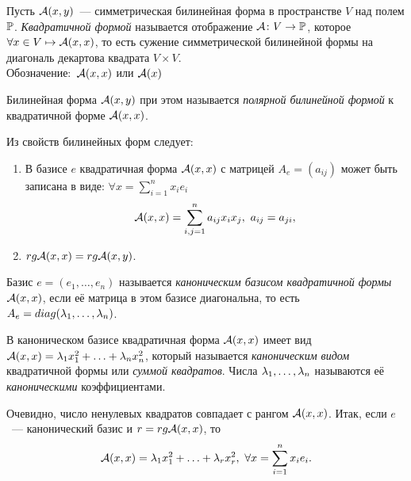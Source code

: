\begin{definition}
Пусть ${\mathcal{A}}(x,y)$~--- симметрическая билинейная форма в пространстве $V$ над полем ${\mathbb{P}}$. \emph{Квадратичной формой} называется отображение ${\mathcal{A}}\colon V\to{\mathbb{P}}$, которое $\forall x\in V\mapsto {\mathcal{A}}(x,x)$, то есть сужение симметрической билинейной формы на диагональ декартова квадрата $V\times V$.\\
\textsf{Обозначение:}~${\mathcal{A}}(x,x)$ или ${\mathcal{A}}(x)$
\end{definition}

\begin{definition}
Билинейная форма ${\mathcal{A}}(x,y)$ при этом называется \emph{полярной билинейной формой} к квадратичной форме ${\mathcal{A}}(x,x)$.
\end{definition}

\begin{Commentwhite}
Из свойств билинейных форм следует:
\begin{enumerate}
    \item В базисе $e$ квадратичная форма ${\mathcal{A}}(x,x)$ с матрицей $A_e=(a_{ij})$ может быть записана в виде: $\forall x=\sum_{i=1}^nx_ie_i$
    \begin{equation}
    \label{eq общий вид кв. формы}
        {\mathcal{A}}(x,x)=\sum_{i,j=1}^na_{ij}x_ix_j,~a_{ij}=a_{ji},
    \end{equation}
    \item $rg{\mathcal{A}}(x,x)=rg{\mathcal{A}}(x,y)$.
\end{enumerate}
\end{Commentwhite}

\begin{definition}
Базис $e=(e_1,\ldots,e_n)$ называется \emph{каноническим базисом квадратичной формы} ${\mathcal{A}}(x,x)$, если её матрица в этом базисе диагональна, то есть $A_e=diag(\lambda_1,\ldots,\lambda_n)$.
\end{definition}

\begin{definition}
В каноническом базисе квадратичная форма ${\mathcal{A}}(x,x)$ имеет вид ${\mathcal{A}}(x,x)=\lambda_1x_1^2+\ldots+\lambda_nx_n^2$, который называется \emph{каноническим видом} квадратичной формы или \emph{суммой квадратов}. Числа $\lambda_1,\ldots,\lambda_n$ называются её \emph{каноническими} коэффициентами.
\end{definition}

\begin{Commentwhite}
Очевидно, число ненулевых квадратов совпадает с рангом ${\mathcal{A}}(x,x)$. Итак, если $e$~--- канонический базис и $r=rg{\mathcal{A}}(x,x)$, то
\begin{equation}
\label{eq канон. вид квадр. формы}
    {\mathcal{A}}(x,x)=\lambda_1x_1^2+\ldots+\lambda_rx_r^2,~\forall x=\sum_{i=1}^nx_ie_i.
\end{equation}
\end{Commentwhite}

